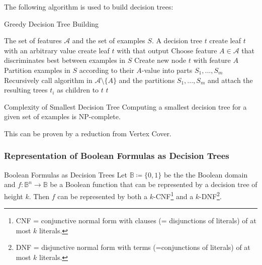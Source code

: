 \documentclass[english]{panikzettel}
\begin{document}

The following algorithm is used to build decision trees:

\begin{algo}{Greedy Decision Tree Building}
{
\renewcommand{\algorithmicrequire}{\textbf{Input:}}
\renewcommand{\algorithmicensure}{\textbf{Output:}}
  \begin{algorithmic}[1]
    \Require The set of features $\mathcal{A}$ and the set of examples $S$.
  \Ensure A decision tree $t$
      \State create leaf $t$ with an arbitrary value
      \State create leaf $t$ with that output
    \Else
      \State Choose feature $A\in\mathcal{A}$ that discriminates best between examples in $S$ 
      \State Create new node $t$ with feature $A$
      \State Partition examples in $S$ according to their $A$-value into parts $S_1,...,S_m$
      \State Recursively call algorithm in $\mathcal{A}\setminus \{A\}$ and the partitions $S_1,...,S_m$ and attach the resulting trees $t_i$ as children to $t$
    \EndIf
  \State \Return $t$
  \end{algorithmic}
}
\end{algo}

\begin{theo}{Complexity of Smallest Decision Tree}
Computing a smallest decision tree for a given set of examples is NP-complete.
\end{theo}

This can be proven by a reduction from Vertex Cover.

\subsubsection{Representation of Boolean Formulas as Decision Trees}
\begin{theo}{Boolean Formulas as Decision Trees}
Let $\mathbb{B} \coloneqq \{0,1\}$ be the the Boolean domain and $f:\mathbb{B}^n\rightarrow \mathbb{B}$ be a Boolean function that can be represented by a decision tree of height $k$. Then $f$ can be represented by both a $k$-CNF\footnote{CNF = conjunctive normal form with clauses (= disjunctions of literals) of at most $k$ literals.} and a $k$-DNF\footnote{DNF = disjunctive normal form with terms (=conjunctions of literals) of at most $k$ literals.}.
\end{theo}
\end{document}
